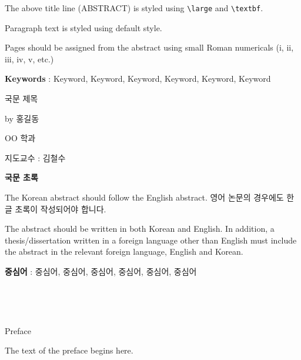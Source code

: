 \documentclass[11pt]{report}
\theoremstyle{plain}
\theoremstyle{definition}
\theoremstyle{corollary}
\theoremstyle{definition}
\theoremstyle{plain}
\theoremstyle{definition}
\theoremstyle{plain}
\begin{document}
The above title line (ABSTRACT) is styled using \verb|\large| and  \verb|\textbf|.

Paragraph text is styled using default style.

Pages should be assigned from the abstract using small Roman numericals (i, ii, iii, iv, v, etc.)

\par\vspace{100pt}

\textbf{Keywords} : Keyword, Keyword, Keyword, Keyword, Keyword, Keyword

\newpage
\begin{center}
\LARGE 국문 제목
\par\vspace{20pt}
\normalsize by 홍길동\par
OO 학과\par
지도교수 : 김철수

\par\vspace{20pt}

\large \textbf{국문 초록}
\end{center}
\normalsize
The Korean abstract should follow the English abstract.
영어 논문의 경우에도 한글 초록이 작성되어야 합니다.

The abstract should be written in both Korean and English.
In addition, a thesis/dissertation written in a foreign language other than English must include the abstract in the relevant foreign language, English and Korean. 

\par\vspace{100pt}

\textbf{중심어} : 중심어, 중심어, 중심어, 중심어, 중심어, 중심어

\newpage
~ %

\newpage
~


\newpage
\begin{center}
\large
Preface
\end{center}
\normalsize
The text of the preface begins here. 
\end{document}
